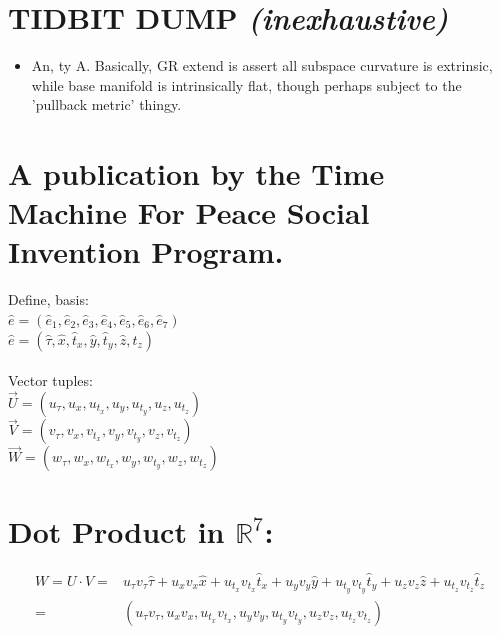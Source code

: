 \documentclass{article}
\begin{document}
\section*{TIDBIT DUMP {\em (inexhaustive)}}

\begin{itemize}
\item[:)]{An, ty A. Basically, GR extend is assert all subspace curvature is extrinsic, while base manifold is intrinsically flat, though perhaps subject to the 'pullback metric' thingy.}
\end{itemize}

\section*{A publication by the Time Machine For Peace Social Invention Program.}

\noindent Define, basis:\\
$\hat e = (\hat e_1, \hat e_2, \hat e_3, \hat e_4, \hat e_5, \hat e_6, \hat e_7)$\\
$\hat e = (\hat\tau, \hat x, \hat t_x, \hat y, \hat t_y, \hat z, \hat t_z)$\\

\\
Vector tuples:\\
$\vec U = (u_\tau, u_x, u_{t_x}, u_y, u_{t_y}, u_z, u_{t_z})$\\
$\vec V = (v_\tau, v_x, v_{t_x}, v_y, v_{t_y}, v_z, v_{t_z})$\\
$\vec W = (w_\tau, w_x, w_{t_x}, w_y, w_{t_y}, w_z, w_{t_z})$ 


\section*{Dot Product in $\mathbb{R}^7$:}
\begin{align*}
W = U \cdot V =& u_\tau v_\tau \hat \tau +u_x v_x \hat x + u_{t_x} v_{t_x} \hat t_x + u_y v_y \hat y + u_{t_y} v_{t_y} \hat t_y + u_z v_z \hat z + u_{t_z} v_{t_z} \hat t_z\\
=& (u_\tau v_\tau, u_x v_x, u_{t_x} v_{t_x}, u_y v_y, u_{t_y} v_{t_y}, u_z v_z, u_{t_z} v_{t_z})\\
\end{align*}
\end{document}
